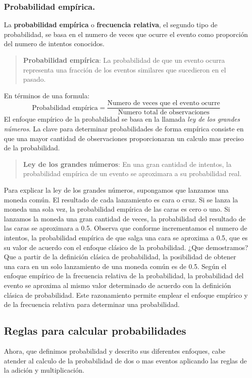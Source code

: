 \documentclass[]{article}
\begin{document}
\subsubsection*{Probabilidad empírica.}
La \textbf{probabilidad empírica} o \textbf{frecuencia relativa}, el segundo tipo de probabilidad, se basa en el numero de veces que ocurre el evento como proporción del numero de intentos conocidos.
\begin{quote}
	\textbf{Probabilidad empírica}: La probabilidad de que un evento ocurra representa una fracción de los eventos similares que sucedieron en el pasado.
\end{quote}
En términos de una formula:
\[ \text{Probabilidad empírica} = \frac{\text{Numero de veces que el evento ocurre}}{\text{Numero total de observaciones}}\]
El enfoque empírico de la probabilidad se basa en la llamada \textit{ley de los grandes números}. La clave para determinar probabilidades de forma empírica consiste en que una mayor cantidad de observaciones proporcionaran un calculo mas preciso de la probabilidad.
\begin{quote}
	\textbf{Ley de los grandes números}:  En una gran cantidad de intentos, la probabilidad empírica de un evento se aproximara a su probabilidad real.
\end{quote}
Para explicar la ley de los grandes números, supongamos que lanzamos una moneda común. El resultado de cada lanzamiento es cara o cruz. Si se lanza la moneda una sola vez, la probabilidad empírica de las caras es cero o uno. Si lanzamos la moneda una gran cantidad de veces, la probabilidad del resultado de las caras se aproximara a 0.5. Observa que conforme incrementamos el numero de intentos, la probabilidad empírica de que salga una cara se aproxima a 0.5, que es su valor de acuerdo con el enfoque clásico de la probabilidad. ¿Que demostramos? Que a partir de la definición clásica de probabilidad, la posibilidad de obtener una cara en un solo lanzamiento de una moneda común es de 0.5. Según el enfoque empírico de la frecuencia relativa de la probabilidad, la probabilidad del evento se aproxima al mismo valor determinado de acuerdo con la definición clásica de probabilidad. Este razonamiento permite emplear el enfoque empírico y de la frecuencia relativa para determinar una probabilidad. 
\subsection{Reglas para calcular probabilidades}
Ahora, que definimos probabilidad y descrito sus diferentes enfoques, cabe atender al calculo de la probabilidad de dos o mas eventos aplicando las reglas de la adición y multiplicación.
\end{document}
